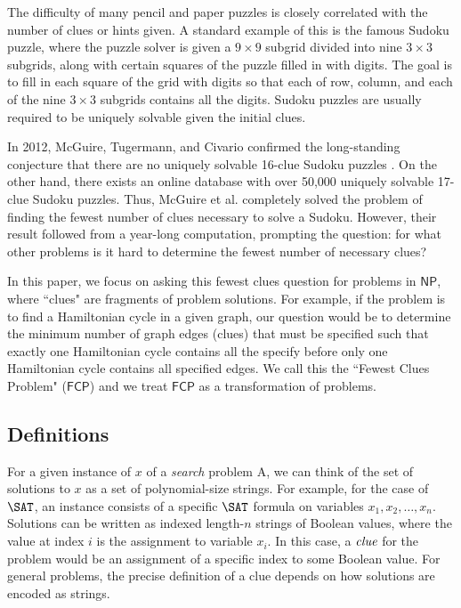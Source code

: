 \documentclass[runningheads,a4paper]{llncs}
\begin{document}
The difficulty of many pencil and paper puzzles is closely correlated with the number of clues or hints given. A standard example of this is the famous Sudoku puzzle, where the puzzle solver is given a $9 \times 9$ subgrid divided into nine $3 \times 3$ subgrids, along with certain squares of the puzzle filled in with digits. The goal is to fill in each square of the grid with digits so that each of row, column, and each of the nine $3 \times 3$ subgrids contains all the digits. Sudoku puzzles are usually required to be uniquely solvable given the initial clues.

In 2012, McGuire, Tugermann, and Civario confirmed the long-standing conjecture that there are no uniquely solvable 16-clue Sudoku puzzles \cite{mcguire2012there}. On the other hand, there exists an online database with over 50,000 uniquely solvable 17-clue Sudoku puzzles. Thus, McGuire et al. completely solved the problem of finding the fewest number of clues necessary to solve a Sudoku. However, their result followed from a year-long computation, prompting the question: for what other problems is it hard to determine the fewest number of necessary clues?

In this paper, we focus on asking this fewest clues question for problems in $\mathsf{NP}$, where ``clues" are fragments of problem solutions. For example, if the problem is to find a Hamiltonian cycle in a given graph, our question would be to determine the minimum number of graph edges (clues) that must be specified such that exactly one Hamiltonian cycle contains all the  specify before only one Hamiltonian cycle contains all specified edges. We call this the ``Fewest Clues Problem" ($\mathsf{FCP}$) and we treat $\mathsf{FCP}$ as a transformation of problems. 

\subsection{Definitions}

For a given instance of $x$ of a \emph{search} problem A, we can think of the set of solutions to $x$ as a set of polynomial-size strings. For example, for the case of $\SAT$, an instance consists of a specific $\SAT$ formula on variables $x_1,x_2,\dots,x_n$. Solutions can be written as indexed length-$n$ strings of Boolean values, where the value at index $i$ is the assignment to variable $x_i$. In this case, a $\emph{clue}$ for the problem would be an assignment of a specific index to some Boolean value. For general problems, the precise definition of a clue depends on how solutions are encoded as strings.
\end{document}
